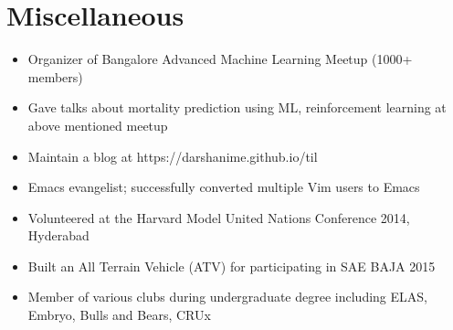 \documentclass[10pt,letterpaper]{article}
\begin{document}
\section*{Miscellaneous}

\begin{itemize}
    \item Organizer of Bangalore Advanced Machine Learning Meetup (1000+ members)
    \item Gave talks about mortality prediction using ML, reinforcement learning at above mentioned meetup
    \item Maintain a blog at https://darshanime.github.io/til
    \item Emacs evangelist; successfully converted multiple Vim users to Emacs 
    \item Volunteered at the Harvard Model United Nations Conference 2014, Hyderabad
    \item Built an All Terrain Vehicle (ATV) for participating in SAE BAJA 2015
    \item Member of various clubs during undergraduate degree including ELAS, Embryo, Bulls and Bears, CRUx
\end{itemize}
\end{document}
